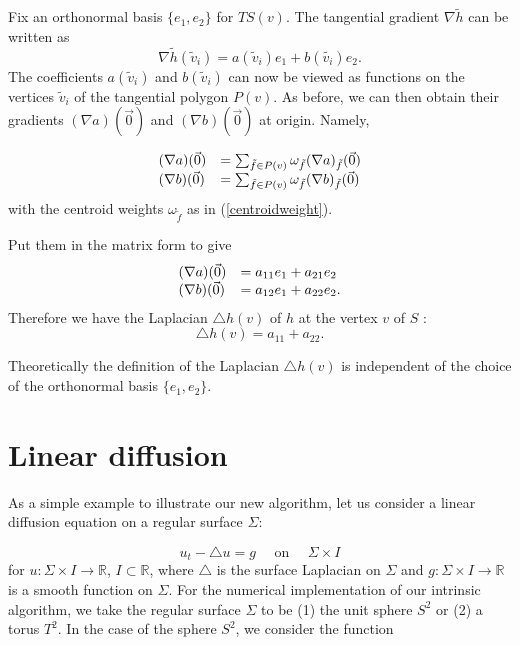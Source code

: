 \documentclass{elsart}
\begin{document}
Fix an orthonormal basis $\{ e_1, e_2 \}$ for $TS(v)$. The
tangential gradient $\nabla \tilde{h}$ can be written as
\begin{equation} \nabla \tilde{h}(\tilde{v}_i) = a(\tilde{v}_i)e_1 +
b(\tilde{v_i})e_2. \end{equation}
 The coefficients $a(\tilde{v}_i)$
and $b(\tilde{v}_i)$ can now be viewed as functions on the vertices
$\tilde{v}_i$ of the tangential polygon $P(v)$. As before, we can
then obtain their gradients $(\nabla a)(\vec{0})$ and $(\nabla
b)(\vec{0})$ at origin. Namely,

\begin{equation}
\begin{array}{ll} (\nabla a)(\vec{0}) & = \sum_{\tilde{f} \in
P(v)} \omega_{\tilde{f}} (\nabla a)_{\tilde{f}}(\vec{0}) \cr (\nabla
b)(\vec{0}) & = \sum_{\tilde{f} \in P(v)} \omega_{\tilde{f}} (\nabla
b)_{\tilde{f}}(\vec{0})
\end{array}\end{equation}
with the centroid weights $\omega _{\tilde{f}}$ as in
(\ref{centroidweight}).

Put them in the matrix form to give
\begin{equation}
\begin{array}{ll} (\nabla a)(\vec{0}) & = a_{11}e_1
+ a_{21}e_2 \cr (\nabla b)(\vec{0}) & = a_{12}e_1 + a_{22} e_2.
\end{array}
\end{equation}
 Therefore we have the Laplacian $\triangle h(v)$ of $h$ at the
vertex $v$ of $S$ :
\begin{equation}
\triangle h(v) = a_{11}+ a_{22}.
\end{equation}

Theoretically the definition of the Laplacian $\triangle h(v)$ is
independent of the choice of the orthonormal basis $\{ e_1, e_2 \}$.



\section{Linear diffusion}

As a simple example to illustrate our new algorithm, let us consider
a linear diffusion equation on a regular surface $\Sigma$:

\begin{equation}\label{heatequation}
u_t - \triangle u = g \mbox{ ~~ on ~~ } \Sigma \times I
\end{equation}
for  $u : \Sigma \times I \rightarrow \mathbb{R} $, $I \subset
\mathbb{R}$, where  $\triangle$ is the surface Laplacian on $\Sigma$
and $g : \Sigma \times I \rightarrow \mathbb{R}$ is a smooth
function on $\Sigma$. For the numerical implementation of our
intrinsic algorithm, we take the regular surface $\Sigma$ to be (1)
the unit sphere $S^2$ or (2) a torus $T^2$. In the case of the
sphere $S^2$, we consider the function
\end{document}
